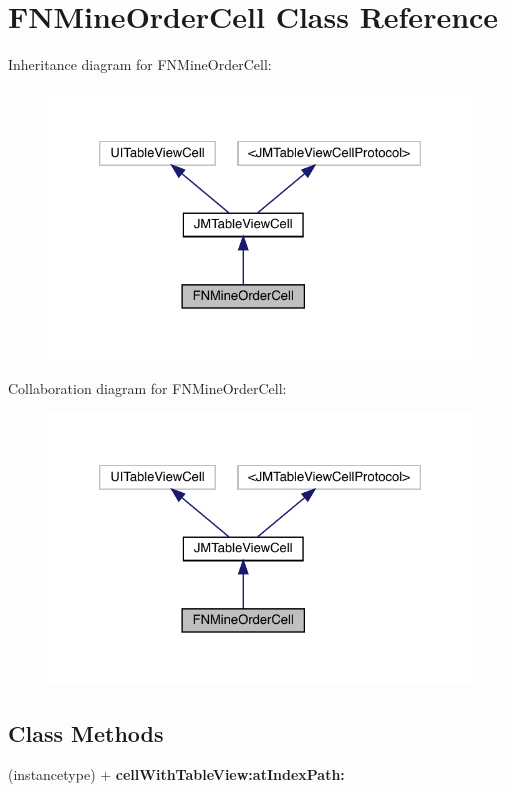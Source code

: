 \hypertarget{interface_f_n_mine_order_cell}{}\section{F\+N\+Mine\+Order\+Cell Class Reference}
\label{interface_f_n_mine_order_cell}


Inheritance diagram for F\+N\+Mine\+Order\+Cell\+:\nopagebreak
\begin{figure}[H]
\begin{center}
\leavevmode
\includegraphics[width=326pt]{interface_f_n_mine_order_cell__inherit__graph}
\end{center}
\end{figure}


Collaboration diagram for F\+N\+Mine\+Order\+Cell\+:\nopagebreak
\begin{figure}[H]
\begin{center}
\leavevmode
\includegraphics[width=326pt]{interface_f_n_mine_order_cell__coll__graph}
\end{center}
\end{figure}
\subsection*{Class Methods}
\begin{DoxyCompactItemize}
\item 
\mbox{\label{interface_f_n_mine_order_cell_a7a18644cf3c8b12cb83aeec1e6b8d5d3}} 
(instancetype) + {\bfseries cell\+With\+Table\+View\+:at\+Index\+Path\+:}
\end{DoxyCompactItemize}
